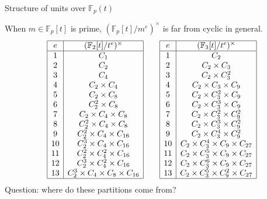 \documentclass[10pt]{beamer}
\begin{document}
\begin{frame}[t]{Structure of units over $ \mathbb{F}_p(t) $}

When $ m \in \mathbb{F}_p[t] $ is prime, $ (\mathbb{F}_p[t] / m^e)^\times $ is far from cyclic in general.
$$
\begin{array}{|c|c|}
\hline
e & (\mathbb{F}_2[t] / t^e)^\times \\
\hline
1 & C_1 \\
2 & C_2 \\
3 & C_4 \\
4 & C_2 \times C_4 \\
5 & C_2 \times C_8 \\
6 & C_2^2 \times C_8 \\
7 & C_2 \times C_4 \times C_8 \\
8 & C_2^2 \times C_4 \times C_8 \\
9 & C_2^2 \times C_4 \times C_{16} \\
10 & C_2^3 \times C_4 \times C_{16} \\
11 & C_2^2 \times C_4^2 \times C_{16} \\
12 & C_2^3 \times C_4^2 \times C_{16} \\
13 & C_2^3 \times C_4 \times C_8 \times C_{16} \\
\hline
\end{array}
\qquad
\begin{array}{|c|c|}
\hline
e & (\mathbb{F}_3[t] / t^e)^\times \\
\hline
1 & C_2 \\
2 & C_2 \times C_3 \\
3 & C_2 \times C_3^2 \\
4 & C_2 \times C_3 \times C_9 \\
5 & C_2 \times C_3^2 \times C_9 \\
6 & C_2 \times C_3^3 \times C_9 \\
7 & C_2 \times C_3^2 \times C_9^2 \\
8 & C_2 \times C_3^3 \times C_9^2 \\
9 & C_2 \times C_3^4 \times C_9^2 \\
10 & C_2 \times C_3^4 \times C_9 \times C_{27} \\
11 & C_2 \times C_3^5 \times C_9 \times C_{27} \\
12 & C_2 \times C_3^6 \times C_9 \times C_{27} \\
13 & C_2 \times C_3^5 \times C_9^2 \times C_{27} \\
\hline
\end{array}
$$
Question: where do these partitions come from?

\end{frame}
\end{document}
